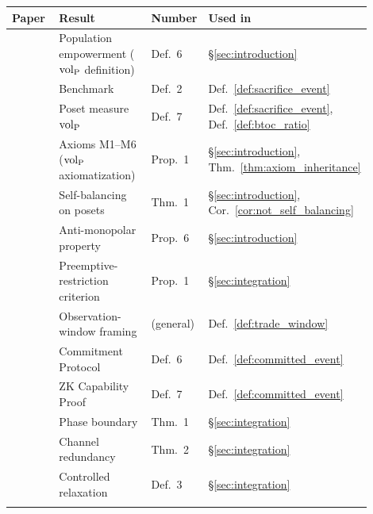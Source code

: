 \begin{center}
\small
\begin{tabular}{@{}>{\raggedright\arraybackslash}p{0.18\linewidth}
                  >{\raggedright\arraybackslash}p{0.34\linewidth}
                  >{\raggedright\arraybackslash}p{0.10\linewidth}
                  >{\raggedright\arraybackslash}p{0.28\linewidth}@{}}
\toprule
\textbf{Paper} & \textbf{Result} & \textbf{Number}
  & \textbf{Used in} \\
\midrule
\citep[Foundation]{lasser2026gfm}
  & Population empowerment (${\operatorname{vol}_{\mathrm{P}}}$ definition) & Def.~6
  & \S\ref{sec:introduction} \\
\citep[Poset~Definition]{lasser2026poset}
  & Benchmark & Def.~2
  & Def.~\ref{def:sacrifice_event} \\
\citep[Poset~Definition]{lasser2026poset}
  & Poset measure ${\operatorname{vol}_{\mathrm{P}}}$ & Def.~7
  & Def.~\ref{def:sacrifice_event},
  Def.~\ref{def:btoc_ratio} \\
\citep[Poset~Definition]{lasser2026poset}
  & Axioms M1--M6 (${\operatorname{vol}_{\mathrm{P}}}$ axiomatization) & Prop.~1
  & \S\ref{sec:introduction},
  Thm.~\ref{thm:axiom_inheritance} \\
\citep[Poset~Definition]{lasser2026poset}
  & Self-balancing on posets & Thm.~1
  & \S\ref{sec:introduction},
  Cor.~\ref{cor:not_self_balancing} \\
\citep[Horizon~Aware]{lasser2026horizon}
  & Anti-monopolar property & Prop.~6
  & \S\ref{sec:introduction} \\
\citep[Horizon~Aware]{lasser2026horizon}
  & Preemptive-restriction criterion & Prop.~1
  & \S\ref{sec:integration} \\
\citep[SCM]{lasser2026scm}
  & Observation-window framing & (general)
  & Def.~\ref{def:trade_window} \\
\citep[Exogenous~Verification]{lasser2026exo}
  & Commitment Protocol & Def.~6
  & Def.~\ref{def:committed_event} \\
\citep[Exogenous~Verification]{lasser2026exo}
  & ZK Capability Proof & Def.~7
  & Def.~\ref{def:committed_event} \\
\citep[Phase~Redundancy]{lasser2026phase}
  & Phase boundary & Thm.~1
  & \S\ref{sec:integration} \\
\citep[Phase~Redundancy]{lasser2026phase}
  & Channel redundancy & Thm.~2
  & \S\ref{sec:integration} \\
\citep[Controlled~Relaxation]{lasser2026wamura}
  & Controlled relaxation & Def.~3
  & \S\ref{sec:integration} \\
\citep[Controlled~Relaxation]{lasser2026wamura}

\end{tabular}
\end{center}
